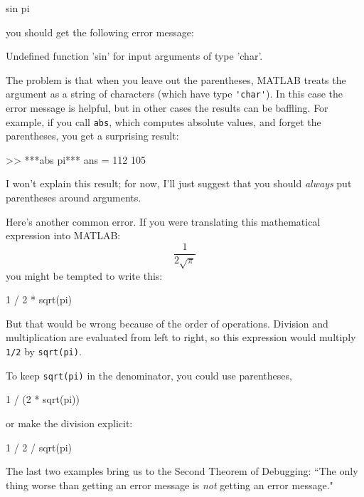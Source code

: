 \begin{code}
sin pi
\end{code}
you should get the following error message:

\begin{stdout}
Undefined function 'sin' for input arguments of type 'char'.
\end{stdout}

The problem is that when you leave out the parentheses, MATLAB treats
the argument as a string of characters (which have type \lstinline{'char'}).
In this case the error message is helpful, but in other cases the results can be baffling.
For example, if you call \lstinline{abs}, which computes absolute values, and forget the parentheses, you get a surprising result:

\begin{code}
>> ***abs pi***
ans =  112   105
\end{code}

I won't explain this result; for now, I'll just suggest that you should \emph{always} put parentheses around arguments.


Here's another common error.
If you were translating this mathematical expression into MATLAB:
%
\[ \frac{1}{2 \sqrt \pi} \]
%
you might be tempted to write this:

\begin{code}
1 / 2 * sqrt(pi)
\end{code}

But that would be wrong because of the order of operations.  Division and multiplication are evaluated from left to right, so this expression would multiply \lstinline{1/2} by \lstinline{sqrt(pi)}.


To keep \lstinline{sqrt(pi)} in the denominator, you could use parentheses,

\begin{code}
1 / (2 * sqrt(pi))
\end{code}
or make the division explicit:

\begin{code}
1 / 2 / sqrt(pi)
\end{code}


The last two examples bring us to the Second Theorem of Debugging: ``The only thing worse than getting an error message is \emph{not} getting an error message."

